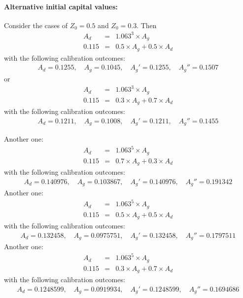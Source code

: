 \documentclass[12pt]{article}
\begin{document}
\begin{appendices}


\paragraph{Alternative initial capital values:}

Consider the cases of $Z_0 = 0.5$ and $Z_0 = 0.3$. Then 
\begin{eqnarray*}
    A_d & = & 1.063^3 \times A_g \\
    0.115 & = & 0.5 \times A_g + 0.5 \times A_d
\end{eqnarray*}
with the following calibration outcomes:
\begin{eqnarray*}
    A_d = 0.1255, \quad A_g = 0.1045, \quad A_g' = 0.1255, \quad A_g'' = 0.1507
\end{eqnarray*}
or
\begin{eqnarray*}
    A_d & = & 1.063^3 \times A_g \\
    0.115 & = & 0.3 \times A_g + 0.7 \times A_d
\end{eqnarray*}
with the following calibration outcomes:
\begin{eqnarray*}
    A_d = 0.1211, \quad A_g = 0.1008, \quad A_g' = 0.1211, \quad A_g'' = 0.1455
\end{eqnarray*}


Another one: %
\begin{eqnarray*}
    A_d & = & 1.063^5 \times A_g \\
    0.115 & = & 0.7 \times A_g + 0.3 \times A_d
\end{eqnarray*}
with the following calibration outcomes:
\begin{eqnarray*}
    A_d = 0.140976, \quad A_g = 0.103867, \quad A_g' = 0.140976, \quad A_g'' = 0.191342
\end{eqnarray*}
Another one: %
\begin{eqnarray*}
    A_d & = & 1.063^5 \times A_g \\
    0.115 & = & 0.5 \times A_g + 0.5 \times A_d
\end{eqnarray*}
with the following calibration outcomes:
\begin{eqnarray*}
    A_d = 0.132458, \quad A_g = 0.0975751, \quad A_g' = 0.132458, \quad A_g'' = 0.1797511
\end{eqnarray*}
Another one: %
\begin{eqnarray*}
    A_d & = & 1.063^5 \times A_g \\
    0.115 & = & 0.3 \times A_g + 0.7 \times A_d
\end{eqnarray*}
with the following calibration outcomes:
\begin{eqnarray*}
    A_d = 0.1248599, \quad A_g = 0.0919934, \quad A_g' = 0.1248599, \quad A_g'' = 0.1694686
\end{eqnarray*}


\end{appendices}
\end{document}
